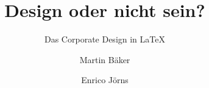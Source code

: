 \documentclass{beamer}
\begin{document}
\title{Design oder nicht sein?}
\subtitle{Das Corporate Design in  LaTeX}
\author{Martin Bäker\and Enrico Jörns}

\begin{frame}[plain]
  \titlepage
\end{frame}
\end{document}
